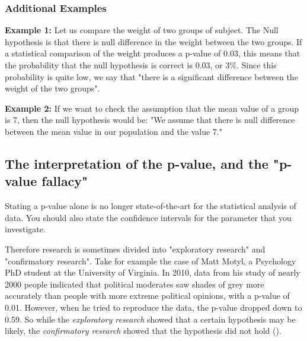 \subsubsection{Additional Examples}

\textbf{Example 1: } Let us compare the weight of two groups of subject. The Null hypothesis is that there is null difference in the weight between the two groups. If a statistical comparison of the weight produces a p-value of 0.03, this means that the probability that the null hypothesis is correct is 0.03, or 3\%. Since this probability is quite low, we say that "there is a significant difference between the weight of the two groups".

\textbf{Example 2: } If we want to check the assumption that the mean value of a group is 7, then the null hypothesis would be: "We assume that there is null difference between the mean value in our population and the value 7."

\subsection{The interpretation of the p-value, and the "p-value fallacy"}


\vspace{5 mm}

Stating a p-value alone is no longer state-of-the-art for the statistical analysis of data. You should also state the confidence intervals for the parameter that you investigate.

Therefore research is sometimes divided into "exploratory research" and "confirmatory research". Take for example the case of Matt Motyl, a Psychology PhD student at the University of Virginia. In 2010, data from his study of nearly 2000 people indicated that political moderates saw shades of grey more accurately than people with more extreme political opinions, with a p-value of 0.01. However, when he tried to reproduce the data, the p-value dropped down to 0.59. So while the \emph{exploratory research} showed that a certain hypothesis may be likely, the \emph{confirmatory research} showed that the hypothesis did not hold (\cite{Nuzzo2014}).

